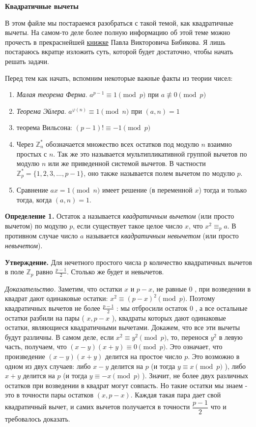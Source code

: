 \centerline{\bf \Huge Квадратичные вычеты}


В этом файле мы постараемся разобраться с такой темой, как квадратичные вычеты. На самом-то деле более полную информацию об этой теме можно прочесть в прекраснейшей \href{https://drive.google.com/file/d/1eIYNdSgwb4Nw8PnFT2Ng2LWQURzPk129/view?usp=sharing}{книжке} Павла Викторовича Бибикова. Я лишь постараюсь вкратце изложить суть, которой будет достаточно, чтобы начать решать задачи.

Перед тем как начать, вспомним некоторые важные факты из теории чисел:

\begin{enumerate}
    \item \textit{Малая теорема Ферма}. $a^{p-1} \equiv 1 \pmod{p}$ при $a \not\equiv 0 \pmod{p}$
    \item \textit{Теорема Эйлера}. $a^{\varphi(n)} \equiv 1 \pmod{n}$ при $(a,n) = 1$
    \item теорема Вильсона: $(p-1)!\equiv -1 \pmod{p}$
    \item Через $\mathbb{Z}_n^*$ обозначается множество всех остатков под модулю $n$ взаимно простых с $n$. Так же это называется мультипликативной группой вычетов по модулю $n$ или же приведенной системой вычетов. В частности $\mathbb{Z}_p^* = \{1, 2, 3, \ldots, p-1\}$, оно также называется полем вычетом по модулю $p$.
    \item Сравнение $ax = 1 \pmod{n}$ имеет решение (в переменной $x$) тогда и только тогда, когда $(a,n) = 1$.
\end{enumerate}

\textbf{Определение 1.}
Остаток а называется \textit{квадратичным вычетом} (или просто вычетом) по модулю $p$, если существует такое целое число $x$, что $x^2 \equiv_p a$. В противном случае число $a$ называется \textit{квадратичным невычетом} (или просто \textit{невычетом}).


\textbf{Утверждение.}
Для нечетного простого числа $р$ количество квадратичных вычетов в поле $\mathbb{Z}_p$ равно $\frac{p-1}{2}$. Столько же будет и невычетов.

\textit{Доказательство.} Заметим, что остатки $x$ и $p-x$, не равные 0 , при возведении в квадрат дают одинаковые остатки: $x^2 \equiv(p-x)^2 \pmod{p}$. Поэтому квадратичных вычетов не более $\frac{p-1}{2}$ : мы отбросили остаток 0 , а все остальные остатки разбили на пары ( $x, p-x$ ), квадраты которых дают одинаковые остатки, являющиеся квадратичными вычетами. Докажем, что все эти вычеты будут различны. В самом деле, если $x^2 \equiv y^2 \pmod{p}$, то, перенося $y^2$ в левую часть, получаем, что $(x-y)(x+y) \equiv 0 \pmod{p}$. Это означает, что произведение $(x-y)(x+y)$ делится на простое число $p$. Это возможно в одном из двух случаев: либо $x-y$ делится на $p$ (и тогда $y \equiv x\pmod{p}$ ), либо $x+y$ делится на $p$ (и тогда $y \equiv-x \pmod{p}$ ). Значит, не более двух различных остатков при возведении в квадрат могут совпасть. Но такие остатки мы знаем - это в точности пары остатков $(x, p-x)$. Каждая такая пара дает свой квадратичный вычет, и самих вычетов получается в точности $\dfrac{p-1}{2}$ что и требовалось доказать.


